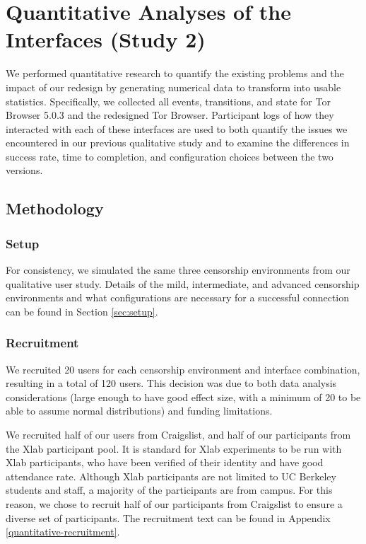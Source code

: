 \documentclass{template}
\begin{document}
\section{Quantitative Analyses of the Interfaces (Study 2)}
We performed quantitative research to quantify the existing problems
and the impact of our redesign by generating numerical data to transform
into usable statistics. Specifically, we collected all events, transitions, 
and state for Tor Browser 5.0.3 and the redesigned Tor Browser. Participant
logs of how they interacted with each of these interfaces are used to both
quantify the issues we encountered in our previous qualitative 
study and to examine the differences in success rate, time to completion,
and configuration choices between the two versions. 

\subsection{Methodology} 
\subsubsection{Setup}
For consistency, we simulated the same three censorship environments from 
our qualitative user study. Details of the mild, intermediate, and advanced 
censorship environments and what configurations are necessary for a 
successful connection can be found in Section \ref{sec:setup}. 

\subsubsection{Recruitment}
We recruited 20 users for each censorship environment
and interface combination, resulting in a total of 120 users. This decision 
was due to both data analysis considerations (large enough to have good effect size, 
with a minimum of 20 to be able to assume normal distributions) and funding
limitations. 

We recruited half of our users from Craigslist, and half of our participants from 
the Xlab participant pool. It is standard for Xlab experiments to be run with Xlab
participants, who have been verified of their identity and have good attendance
rate. Although Xlab participants are not limited to UC Berkeley students and staff,
a majority of the participants are from campus. For this reason, we chose to recruit 
half of our participants from Craigslist to ensure a diverse set of participants. 
The recruitment text can be found in Appendix \ref{quantitative-recruitment}. 
\end{document}

